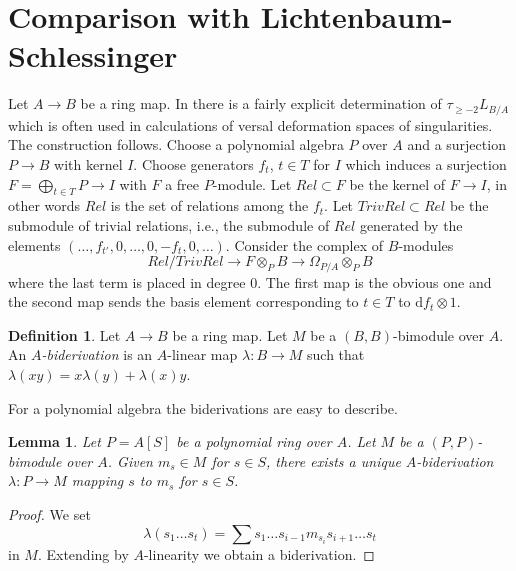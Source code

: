 \documentclass[10pt,a4paper]{article}
\theoremstyle{plain}
\newtheorem{lemma}[subsection]{Lemma}
\theoremstyle{definition}
\newtheorem{definition}[subsection]{Definition}
\theoremstyle{remark}
\numberwithin{equation}{subsection}
\begin{document}
\section{Comparison with Lichtenbaum-Schlessinger}
\label{section-compare-higher}

\noindent
Let $A \to B$ be a ring map. In \cite{Lichtenbaum-Schlessinger}
there is a fairly explicit determination of $\tau_{\geq -2}L_{B/A}$
which is often used in calculations of versal deformation spaces of
singularities. The construction follows.
Choose a polynomial algebra $P$ over $A$
and a surjection $P \to B$ with kernel $I$. Choose generators
$f_t$, $t \in T$ for $I$ which induces a surjection
$F = \bigoplus_{t \in T} P \to I$ with $F$ a free $P$-module.
Let $Rel \subset F$ be the kernel of $F \to I$, in other words
$Rel$ is the set of relations among the $f_t$. Let $TrivRel \subset Rel$
be the submodule of trivial relations, i.e., the submodule of $Rel$
generated by the elements $(\ldots, f_{t'}, 0, \ldots, 0, -f_t, 0, \ldots)$.
Consider the complex of $B$-modules
\begin{equation}
\label{equation-lichtenbaum-schlessinger}
Rel/TrivRel \longrightarrow
F \otimes_P B \longrightarrow
\Omega_{P/A} \otimes_P B
\end{equation}
where the last term is placed in degree $0$. The first map is the obvious
one and the second map sends the basis element corresponding to $t \in T$
to $\text{d}f_t \otimes 1$.

\begin{definition}
\label{definition-biderivation}
Let $A \to B$ be a ring map. Let $M$ be a $(B, B)$-bimodule
over $A$. An {\it $A$-biderivation} is an $A$-linear map $\lambda : B \to M$
such that $\lambda(xy) = x\lambda(y) + \lambda(x)y$.
\end{definition}

\noindent
For a polynomial algebra the biderivations are easy to describe.

\begin{lemma}
\label{lemma-polynomial-ring-unique}
Let $P = A[S]$ be a polynomial ring over $A$. Let $M$ be a $(P, P)$-bimodule
over $A$. Given $m_s \in M$ for $s \in S$, there exists a unique
$A$-biderivation $\lambda : P \to M$ mapping $s$ to $m_s$ for $s \in S$.
\end{lemma}

\begin{proof}
We set
$$
\lambda(s_1 \ldots s_t) =
\sum s_1 \ldots s_{i - 1} m_{s_i} s_{i + 1} \ldots s_t
$$
in $M$. Extending by $A$-linearity we obtain a biderivation.
\end{proof}
\end{document}

